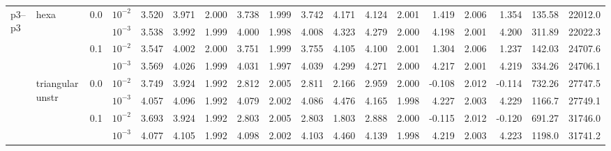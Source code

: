 \begin{longtable}{llclrrrrrrrrrrrrrr}
\multirow{8}{*}{p3--p3} & \multirow{4}{*}{hexa} & \multirow{2}{*}{0.0} & $10^{-2}$ & 3.520 & 3.971 & 2.000 & 3.738 & 1.999 & 3.742 & 4.171 & 4.124 & 2.001 & 1.419 & 2.006 & 1.354 & 135.58 & 22012.0 \\
& & & $10^{-3}$ & 3.538 & 3.992 & 1.999 & 4.000 & 1.998 & 4.008 & 4.323 & 4.279 & 2.000 & 4.198 & 2.001 & 4.200 & 311.89 & 22022.3 \\\cline{3-18}
& & \multirow{2}{*}{0.1} & $10^{-2}$ & 3.547 & 4.002 & 2.000 & 3.751 & 1.999 & 3.755 & 4.105 & 4.100 & 2.001 & 1.304 & 2.006 & 1.237 & 142.03 & 24707.6 \\
& & & $10^{-3}$ & 3.569 & 4.026 & 1.999 & 4.031 & 1.997 & 4.039 & 4.299 & 4.271 & 2.000 & 4.217 & 2.001 & 4.219 & 334.26 & 24706.1 \\\cline{2-18}
& \multirow{4}{*}{triangular unstr} & \multirow{2}{*}{0.0} & $10^{-2}$ & 3.749 & 3.924 & 1.992 & 2.812 & 2.005 & 2.811 & 2.166 & 2.959 & 2.000 & -0.108 & 2.012 & -0.114 & 732.26 & 27747.5 \\
& & & $10^{-3}$ & 4.057 & 4.096 & 1.992 & 4.079 & 2.002 & 4.086 & 4.476 & 4.165 & 1.998 & 4.227 & 2.003 & 4.229 & 1166.7 & 27749.1 \\\cline{3-18}
& & \multirow{2}{*}{0.1} & $10^{-2}$ & 3.693 & 3.924 & 1.992 & 2.803 & 2.005 & 2.803 & 1.803 & 2.888 & 2.000 & -0.115 & 2.012 & -0.120 & 691.27 & 31746.0 \\
& & & $10^{-3}$ & 4.077 & 4.105 & 1.992 & 4.098 & 2.002 & 4.103 & 4.460 & 4.139 & 1.998 & 4.219 & 2.003 & 4.223 & 1198.0 & 31741.2 \\\hline

\bottomrule
\end{longtable}
\normalsize
